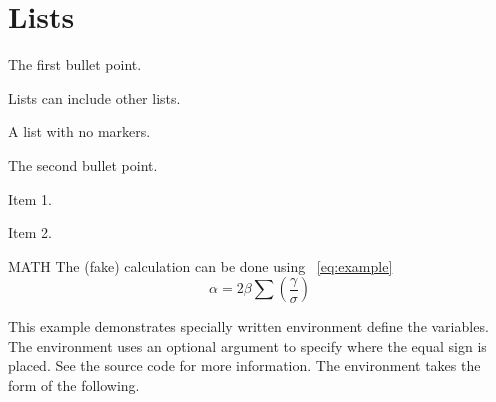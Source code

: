 \section{Lists}
\begin{bulletedlist}
	\item The first bullet point.
	\begin{bulletedlist}
		\item Lists can include other lists.
		\begin{plainlist}
			\item A list with no markers.
		\end{plainlist}
	\end{bulletedlist}
	\item The second bullet point.
	\begin{numberedlist}
		\item Item 1.
		\item Item 2.
	\end{numberedlist}
\end{bulletedlist}

 MATH
The (fake) calculation can be done using \equationname~\ref{eq:example}
\begin{equation}
	\alpha = 2\beta\sum \left( \frac{\gamma}{\sigma} \right)
	\label{eq:example}
\end{equation}
\begin{mathwhere}[0.3in] %
\end{mathwhere}
This example demonstrates specially written  environment define the variables.  The  environment uses an optional argument to specify where the equal sign is placed.  See the source code for more information.  The environment takes the form of the following.
\begin{plainlist}
	\item {}
	\begin{plainlist}
		\item {}
	\end{plainlist}
	\item {}
\end{plainlist}
\begin{mathwhere}[0.85in]
\end{mathwhere}


